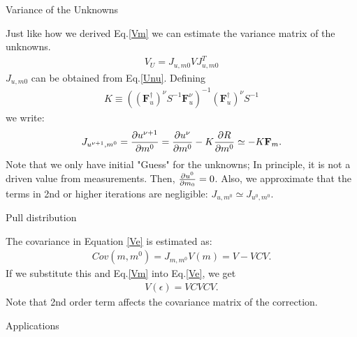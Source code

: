 \documentclass[
	xcolor=dvipsnames,
	aspectratio=169,	
	10pt, 
	]{beamer}
\begin{document}
\begin{frame}{Variance of the Unknowns}
	\begin{block}{}
		Just like how we derived  Eq.\eqref{Vm} we can estimate the variance matrix of the unknowns. 
		\begin{align}
			V_U = J_{u,m0} V J_{u,m0}^T
		\end{align}
		$J_{u,m0}$ can be obtained from Eq.\eqref{Unu}. Defining 
		\begin{align}
			K\equiv ((\mathbf{F}_u^\dagger)^\nu S^{-1}\mathbf F^\nu_u)^{-1}(\mathbf{F}_u^\dagger)^\nu S^{-1}
		\end{align}
		we write:
		\begin{align}
			J_{u^{\nu+1},m^0} = \frac{\partial u^{\nu+1}}{\partial m^0} = \frac{\partial u^{\nu}}{\partial m^0} - K\frac{\partial R}{\partial m^0} \simeq -K \mathbf{F}_m.
		\end{align}
		Note that we only have initial "Guess" for the unknowns; In principle, it is not a driven value from measurements. Then, $\frac{\partial u^0}{\partial m_0} = 0$. Also, we approximate that the terms in 2nd or higher iterations are negligible: $J_{u,m^0}\simeq J_{u^0,m^0}$.
	\end{block}
\end{frame}
\begin{frame}{Pull distribution}
	\begin{block}{}
		The covariance in Equation \eqref{Ve} is estimated as:
		\begin{align}
			Cov(m,m^0) = J_{m,m^0}V(m) = V - VCV.
		\end{align}
		If we substitute this and Eq.\eqref{Vm} into Eq.\eqref{Ve}, we get
		\begin{align}
			V(\epsilon) = VCVCV.
		\end{align}
		Note that 2nd order term affects the covariance matrix of the correction. 
	\end{block}
\end{frame}
\begin{frame}{Applications}

\end{frame}
\end{document}
